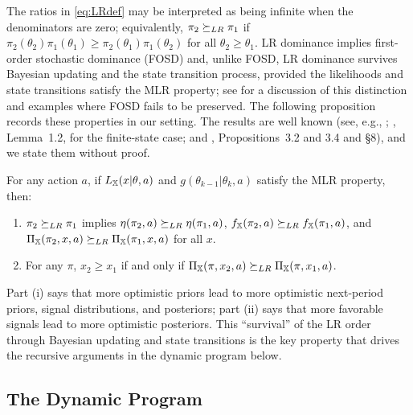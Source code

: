 The ratios in \eqref{eq:LRdef} may be interpreted as being infinite when
the denominators are zero; equivalently, $\pi_2 \succeq_{LR} \pi_1$ if
$\pi_2(\theta_2)\pi_1(\theta_1) \geq \pi_2(\theta_1)\pi_1(\theta_2)$
for all $\theta_2 \geq \theta_1$. LR dominance implies first-order
stochastic dominance (FOSD) and, unlike FOSD, LR dominance survives
Bayesian updating and the state transition process, provided the
likelihoods and state transitions satisfy the MLR property; see
\citet{ulu2009uncertainty} for a discussion of this distinction and
examples where FOSD fails to be preserved. The following proposition
records these properties in our setting. The results are well known
(see, e.g., \citealt{whitt1979note}; \citealt{lovejoy1987some},
Lemma~1.2, for the finite-state case; and \citealt{ulu2009uncertainty},
Propositions~3.2 and 3.4 and \S8), and we state them without proof.

\begin{proposition}\label{prop:monotone_beliefs}
For any action $a$, if $L_{\mathbb{X}}(x|\theta,a)$ and
$g(\theta_{k-1}|\theta_k,a)$ satisfy the MLR property, then:
\begin{enumerate}
\item $\pi_2 \succeq_{LR} \pi_1$ implies $\eta(\pi_2,a) \succeq_{LR} \eta(\pi_1,a)$,
  $f_{\mathbb{X}}(\pi_2,a) \succeq_{LR} f_{\mathbb{X}}(\pi_1,a)$, and
  $\Pi_{\mathbb{X}}(\pi_2, x, a) \succeq_{LR} \Pi_{\mathbb{X}}(\pi_1, x, a)$ for all $x$.
\item For any $\pi$, $x_2 \geq x_1$ if and only if
  $\Pi_{\mathbb{X}}(\pi,x_2,a) \succeq_{LR} \Pi_{\mathbb{X}}(\pi,x_1,a)$.
\end{enumerate}
\end{proposition}

Part (i) says that more optimistic priors lead to more optimistic
next-period priors, signal distributions, and posteriors; part (ii) says
that more favorable signals lead to more optimistic posteriors. This
``survival'' of the LR order through Bayesian updating and state
transitions is the key property that drives the recursive arguments in
the dynamic program below.

\subsection{The Dynamic Program}\label{sec:dp}

